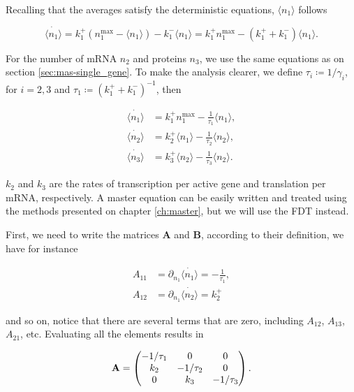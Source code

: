 Recalling that the averages satisfy the deterministic equations, $\langle n_1\rangle$ follows

\begin{equation*}
  \dot{\langle n_1\rangle} = k_1^+(n_1^\text{max}-\langle n_1\rangle) - k_1^-\langle n_1\rangle = k_1^+n_1^\text{max} - (k_1^++k_1^-)\langle n_1\rangle.
\end{equation*}

For the number of mRNA $n_2$ and proteins $n_3$, we use the same equations as on section \ref{sec:mas-single_gene}. To make the analysis clearer, we define $\tau_i\coloneqq 1/\gamma_i$, for $i=2,3$ and $\tau_1\coloneqq (k_1^++k_1^-)^{-1}$, then

\begin{equation}
  \begin{split}
    \dot{\langle n_1\rangle} &= k_1^+n_1^\text{max} - \frac{1}{\tau_1}\langle n_1\rangle,\\
    \dot{\langle n_2\rangle} &= k_2^+\langle n_1\rangle - \frac{1}{\tau_2}\langle n_2\rangle,\\
    \dot{\langle n_3\rangle} &= k_3^+\langle n_2\rangle - \frac{1}{\tau_3}\langle n_2\rangle.
  \end{split}
\end{equation}

$k_2$ and $k_3$ are the rates of transcription per active gene and translation per mRNA, respectively. A master equation can be easily written and treated using the methods presented on chapter \ref{ch:master}, but we will use the FDT instead.

First, we need to write the matrices $\mathbf{A}$ and $\mathbf{B}$, according to their definition, we have for instance

\begin{equation*}
  \begin{split}
    A_{11} &= \partial_{n_1}\dot{\langle n_1\rangle} =-\frac{1}{\tau_1},\\
    A_{12} &= \partial_{n_1}\dot{\langle n_2\rangle} = k_2^+
  \end{split}
\end{equation*}

and so on, notice that there are several terms that are zero, including $A_{12}$, $A_{13}$, $A_{21}$, etc. Evaluating all the elements results in

\begin{equation}
  \label{eq:fdt-A}
  \mathbf{A} = \begin{pmatrix}
    -1/\tau_1 & 0 & 0 \\
    k_2 & -1/\tau_2 & 0 \\
    0 & k_3 & -1/\tau_3
  \end{pmatrix}.\\
\end{equation}

